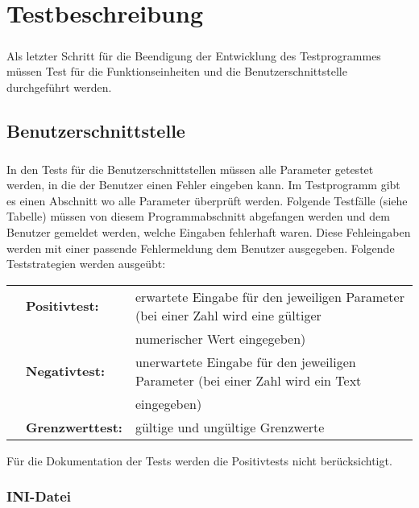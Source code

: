 \chapter{Testbeschreibung}\label{chp:Testbeschreibung}
\paragraph{}
Als letzter Schritt für die Beendigung der Entwicklung des Testprogrammes müssen Test für die Funktionseinheiten und die Benutzerschnittstelle durchgeführt werden. 


\section{Benutzerschnittstelle}
\paragraph{}
In den Tests für die Benutzerschnittstellen müssen alle Parameter getestet werden, in die der Benutzer einen Fehler eingeben kann. Im Testprogramm gibt es einen Abschnitt wo alle Parameter überprüft werden. Folgende Testfälle (siehe Tabelle) müssen von diesem Programmabschnitt abgefangen werden und dem Benutzer gemeldet werden, welche Eingaben fehlerhaft waren. Diese Fehleingaben werden mit einer passende Fehlermeldung dem Benutzer ausgegeben. Folgende Teststrategien werden ausgeübt:

\begin{tabular}{lll}

&\textbf{Positivtest:} &erwartete Eingabe für den jeweiligen Parameter (bei einer Zahl wird eine gültiger\\
& & numerischer Wert eingegeben)\\

&\textbf{Negativtest:} &unerwartete Eingabe für den jeweiligen Parameter (bei einer Zahl wird ein Text\\
& & eingegeben)\\

&\textbf{Grenzwerttest:} &gültige und ungültige Grenzwerte\\
\end{tabular}

Für die Dokumentation der Tests werden die Positivtests nicht berücksichtigt. 


\subsection{INI-Datei}
